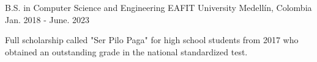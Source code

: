 

\begin{cventries}

  \cventry
    {B.S. in Computer Science and Engineering} %
    {EAFIT University} %
    {Medellín, Colombia} %
    {Jan. 2018 - June. 2023} %
    {
      \begin{cvitems} %
        \item {Full scholarship called "Ser Pilo Paga" for high school students from 2017 who
        obtained an outstanding grade in the national standardized test.}
      \end{cvitems}
    }

\end{cventries}
